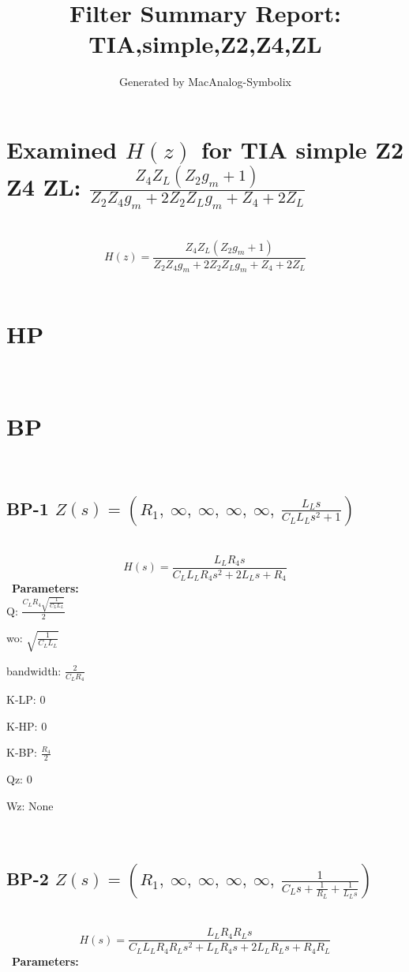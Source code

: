 \documentclass{article}
\begin{document}
        
                        \title{Filter Summary Report: TIA,simple,Z2,Z4,ZL}
                        \author{Generated by MacAnalog-Symbolix}
                        \maketitle

                        \tableofcontents
                        \newpage
                        \section{Examined $H(z)$ for TIA simple Z2 Z4 ZL: $\frac{Z_{4} Z_{L} \left(Z_{2} g_{m} + 1\right)}{Z_{2} Z_{4} g_{m} + 2 Z_{2} Z_{L} g_{m} + Z_{4} + 2 Z_{L}}$ }\ 
\textbf{\[H(z) = \frac{Z_{4} Z_{L} \left(Z_{2} g_{m} + 1\right)}{Z_{2} Z_{4} g_{m} + 2 Z_{2} Z_{L} g_{m} + Z_{4} + 2 Z_{L}}\] }\ 
\section{HP}\ 
\section{BP}\ 
\subsection{BP-1 $Z(s) = \left( R_{1}, \  \infty, \  \infty, \  \infty, \  \infty, \  \frac{L_{L} s}{C_{L} L_{L} s^{2} + 1}\right)$ } \ 
\textbf{\[H(s) = \frac{L_{L} R_{4} s}{C_{L} L_{L} R_{4} s^{2} + 2 L_{L} s + R_{4}}\] } \ 
\textbf{Parameters:}\\ 

Q: $\frac{C_{L} R_{4} \sqrt{\frac{1}{C_{L} L_{L}}}}{2}$\ 

wo: $\sqrt{\frac{1}{C_{L} L_{L}}}$\ 

bandwidth: $\frac{2}{C_{L} R_{4}}$\ 

K-LP: $0$\ 

K-HP: $0$\ 

K-BP: $\frac{R_{4}}{2}$\ 

Qz: $0$\ 

Wz: $\text{None}$\ 

\ 

\subsection{BP-2 $Z(s) = \left( R_{1}, \  \infty, \  \infty, \  \infty, \  \infty, \  \frac{1}{C_{L} s + \frac{1}{R_{L}} + \frac{1}{L_{L} s}}\right)$ } \ 
\textbf{\[H(s) = \frac{L_{L} R_{4} R_{L} s}{C_{L} L_{L} R_{4} R_{L} s^{2} + L_{L} R_{4} s + 2 L_{L} R_{L} s + R_{4} R_{L}}\] } \ 
\textbf{Parameters:}\\ 
\end{document}
